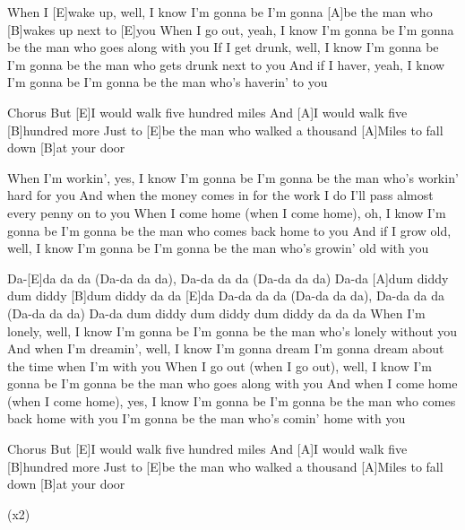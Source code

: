 

\begin{guitar}
	When I [E]wake up, well, I know I'm gonna be
	I'm gonna [A]be the man who [B]wakes up next to [E]you
	When I go out, yeah, I know I'm gonna be
	I'm gonna be the man who goes along with you
	If I get drunk, well, I know I'm gonna be
	I'm gonna be the man who gets drunk next to you
	And if I haver, yeah, I know I'm gonna be
	I'm gonna be the man who's haverin' to you
	
  \begin{chorus}{Chorus}
	But [E]I would walk five hundred miles
	And [A]I would walk five [B]hundred more
	Just to [E]be the man who walked a thousand
	[A]Miles to fall down [B]at your door%
  \end{chorus}
	
	When I'm workin', yes, I know I'm gonna be
	I'm gonna be the man who's workin' hard for you
	And when the money comes in for the work I do
	I'll pass almost every penny on to you
	When I come home (when I come home), oh, I know I'm gonna be
	I'm gonna be the man who comes back home to you
	And if I grow old, well, I know I'm gonna be
	I'm gonna be the man who's growin' old with you
	
	 
	
	Da-[E]da da da (Da-da da da), Da-da da da (Da-da da da)
	Da-da [A]dum diddy dum diddy [B]dum diddy da da [E]da
	Da-da da da (Da-da da da), Da-da da da (Da-da da da)
	Da-da dum diddy dum diddy dum diddy da da da
	\pagebreak
	When I'm lonely, well, I know I'm gonna be
	I'm gonna be the man who's lonely without you
	And when I'm dreamin', well, I know I'm gonna dream
	I'm gonna dream about the time when I'm with you
	When I go out (when I go out), well, I know I'm gonna be
	I'm gonna be the man who goes along with you
	And when I come home (when I come home), yes, I know I'm gonna be
	I'm gonna be the man who comes back home with you
	I'm gonna be the man who's comin' home with you
	
  \begin{chorus}{Chorus}
	But [E]I would walk five hundred miles
	And [A]I would walk five [B]hundred more
	Just to [E]be the man who walked a thousand
	[A]Miles to fall down [B]at your door%
  \end{chorus}
	
	  (x2)
	
	 
\end{guitar}
